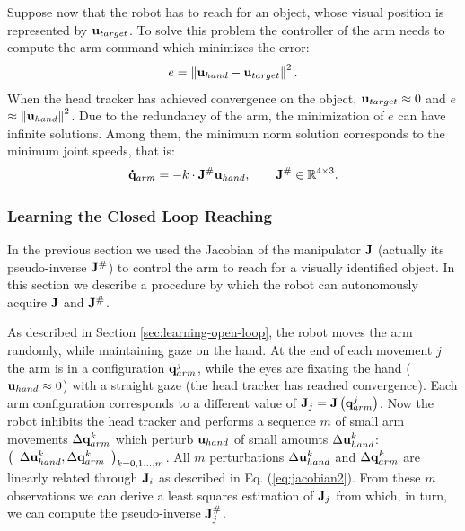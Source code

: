 Suppose now that the robot has to reach for an object, whose visual position is 
represented by $\mathbf{u}_{target}$. To solve this problem 
the controller of the arm needs to compute the arm command which minimizes 
the error:
%
\begin{equation}
  e=\left\|\mathbf{u}_{hand}-\mathbf{u}_{target}\right\|^2.
\end{equation}
%
When the head tracker has achieved convergence on the object, 
$\mathbf{u}_{target} \approx 0 $ and $e$ $\approx \left\|\mathbf{u}_{hand}\right\|^2$.
Due to the redundancy of the arm, the minimization of $e$ can have
infinite solutions. Among them, the minimum norm solution corresponds
to the minimum joint speeds, that is:
%
\begin{equation} \label{Eq:ClosedLoopStrategy}
\mathbf{\dot q}_{arm}=-k \cdot \mathbf J^\# \mathbf{u}_{hand}, 
\qquad \mathbf J^\# \in \mathbb R^{4 \times 3}.
\end{equation}
%

\subsubsection{Learning the Closed Loop Reaching}
%
In the previous section we used the Jacobian of the manipulator
$\mathbf J$ (actually its pseudo-inverse $\mathbf J^\#$) to 
control the arm to reach for a visually identified object. In 
this section we describe a procedure by which the robot can 
autonomously acquire $\mathbf J$ and $\mathbf J^\#$.

As described in Section \ref{sec:learning-open-loop}, the robot 
moves the arm randomly, while maintaining gaze on the hand. At 
the end of each movement $j$ the arm is in a configuration 
$\mathbf q_{arm}^j$,  while the eyes are fixating the hand 
($\mathbf{u}_{hand} \approx 0$) with a straight gaze
(the head tracker has reached convergence). Each 
arm configuration corresponds to a different value of 
$\mathbf J_j=\mathbf J\left(\mathbf q_{arm}^j\right)$. 
Now the robot inhibits the head tracker and performs a sequence $m$
of small arm movements $\Delta \mathbf {q}_{arm}^k$ which perturb $\mathbf{u}_{hand}$ of small amounts $\Delta \mathbf {u}_{hand}^k$:$
  \left(\begin{array}{cc}
    \Delta \mathbf {u}_{hand}^k , 
	\Delta \mathbf {q}_{arm}^k \end{array}
  \right)_{k = 0,1\dots,m}
$. All $m$ perturbations $\Delta \mathbf {u}_{hand}^k$ and 
$\Delta \mathbf {q}_{arm}^k$ are linearly related through $\mathbf J_i$ 
as described in Eq. (\ref{eq:jacobian2}). From these $m$ 
observations we can derive a least squares estimation of $\mathbf J_j$ from 
which, in turn, we can compute the pseudo-inverse $\mathbf J_j^\#$. 

